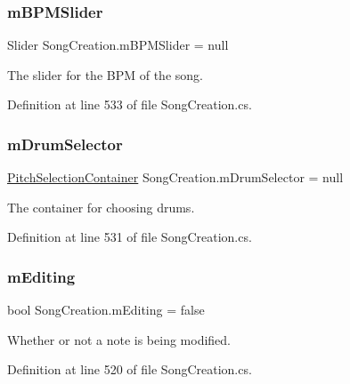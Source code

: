 \subsubsection{\texorpdfstring{m\+B\+P\+M\+Slider}{mBPMSlider}}
{\footnotesize\ttfamily Slider Song\+Creation.\+m\+B\+P\+M\+Slider = null\hspace{0.3cm}{\ttfamily [private]}}



The slider for the B\+PM of the song. 



Definition at line 533 of file Song\+Creation.\+cs.

\mbox{\label{group___s_c_priv_var_ga3f1c71d8cabe505745220d728c6f97bc}} 
\subsubsection{\texorpdfstring{m\+Drum\+Selector}{mDrumSelector}}
{\footnotesize\ttfamily \hyperlink{class_song_creation_1_1_pitch_selection_container}{Pitch\+Selection\+Container} Song\+Creation.\+m\+Drum\+Selector = null\hspace{0.3cm}{\ttfamily [private]}}



The container for choosing drums. 



Definition at line 531 of file Song\+Creation.\+cs.

\mbox{\label{group___s_c_priv_var_ga5aec1c6ae4159b96ce466ee6b1da3371}} 
\subsubsection{\texorpdfstring{m\+Editing}{mEditing}}
{\footnotesize\ttfamily bool Song\+Creation.\+m\+Editing = false\hspace{0.3cm}{\ttfamily [private]}}



Whether or not a note is being modified. 



Definition at line 520 of file Song\+Creation.\+cs.

